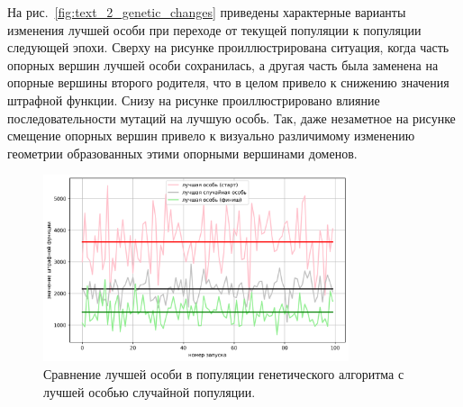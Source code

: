 На рис.~\ref{fig:text_2_genetic_changes} приведены характерные варианты изменения лучшей особи при переходе от текущей популяции к популяции следующей эпохи.
Сверху на рисунке проиллюстрирована ситуация, когда часть опорных вершин лучшей особи сохранилась, а другая часть была заменена на опорные вершины второго родителя, что в целом привело к снижению значения штрафной функции.
Снизу на рисунке проиллюстрировано влияние последовательности мутаций на лучшую особь.
Так, даже незаметное на рисунке смещение опорных вершин привело к визуально различимому изменению геометрии образованных этими опорными вершинами доменов.

\begin{figure}[ht]
\centering
\includegraphics[width=0.8\textwidth]{fig/par_gen_chart2.png}
\singlespacing
{}\caption{Сравнение лучшей особи в популяции генетического алгоритма с лучшей особью случайной популяции.}
\label{fig:text_2_genetic_chart2}
\end{figure}

